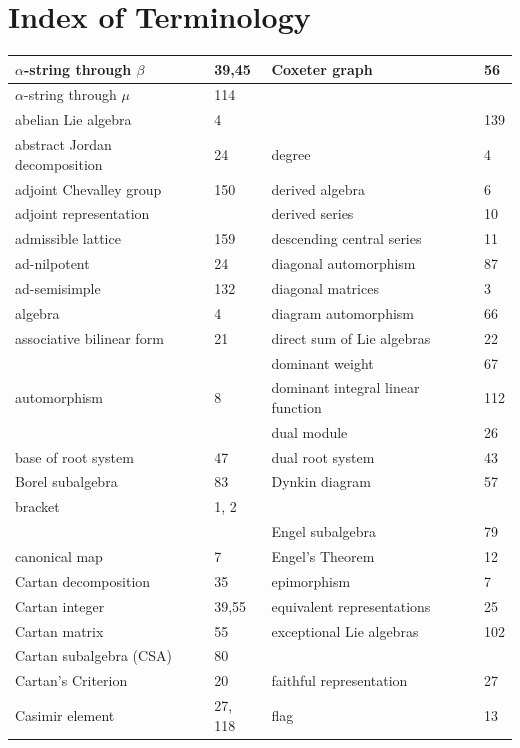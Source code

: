 \documentclass[10pt]{article}
\begin{document}
\section*{Index of Terminology}
\begin{center}
\begin{tabular}{|l|l|l|l|}
\hline
$\alpha$-string through $\beta$ & 39,45 & Coxeter graph & 56 \\
\hline
$\alpha$-string through $\mu$ & 114 &  &  \\
\hline
abelian Lie algebra & 4 &  & 139 \\
\hline
abstract Jordan decomposition & 24 & degree & 4 \\
\hline
adjoint Chevalley group & 150 & derived algebra & 6 \\
\hline
adjoint representation &  & derived series & 10 \\
\hline
admissible lattice & 159 & descending central series & 11 \\
\hline
ad-nilpotent & 24 & diagonal automorphism & 87 \\
\hline
ad-semisimple & 132 & diagonal matrices & 3 \\
\hline
algebra & 4 & diagram automorphism & 66 \\
\hline
associative bilinear form & 21 & direct sum of Lie algebras & 22 \\
\hline
 &  & dominant weight & 67 \\
\hline
automorphism & 8 & dominant integral linear function & 112 \\
\hline
 &  & dual module & 26 \\
\hline
base of root system & 47 & dual root system & 43 \\
\hline
Borel subalgebra & 83 & Dynkin diagram & 57 \\
\hline
bracket & 1, 2 &  &  \\
\hline
 &  & Engel subalgebra & 79 \\
\hline
canonical map & 7 & Engel's Theorem & 12 \\
\hline
Cartan decomposition & 35 & epimorphism & 7 \\
\hline
Cartan integer & 39,55 & equivalent representations & 25 \\
\hline
Cartan matrix & 55 & exceptional Lie algebras & 102 \\
\hline
Cartan subalgebra (CSA) & 80 &  &  \\
\hline
Cartan's Criterion & 20 & faithful representation & 27 \\
\hline
Casimir element & 27, 118 & flag & 13 \\

\end{tabular}
\end{center}
\end{document}
